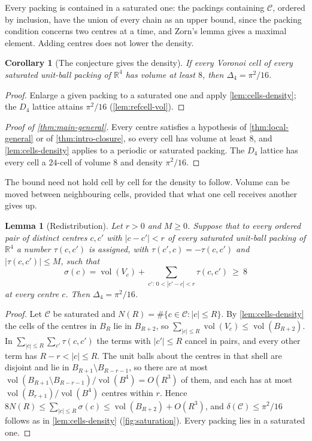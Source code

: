 \documentclass[11pt,reqno]{amsart}
\renewcommand{\_}{\origunderscore\allowbreak}
\numberwithin{equation}{section}
\theoremstyle{plain}
\newtheorem{lem}[thm]{Lemma}
\newtheorem{cor}[thm]{Corollary}
\theoremstyle{definition}
\theoremstyle{remark}
\DeclareMathOperator{\vol}{vol}
\begin{document}
Every packing is contained in a saturated one: the packings containing
$\mathcal{C}$, ordered by inclusion, have the union of every chain as an
upper bound, since the packing condition concerns two centres at a time,
and Zorn's lemma gives a maximal element. Adding centres does not lower
the density.

\begin{cor}[The conjecture gives the density]\label{cor:conj-density}
If every Voronoi cell of every saturated unit-ball packing of
$\mathbb{R}^4$ has volume at least $8$, then $\Delta_4=\pi^2/16$.
\end{cor}

\begin{proof}
Enlarge a given packing to a saturated one and apply
\cref{lem:cells-density}; the $D_4$ lattice attains $\pi^2/16$
(\cref{lem:refcell-vol}).
\end{proof}

\begin{proof}[Proof of \cref{thm:main-general}]
Every centre satisfies a hypothesis of \cref{thm:local-general} or of
\cref{thm:intro-closure}, so every cell has volume at least $8$, and
\cref{lem:cells-density} applies to a periodic or saturated packing. The
$D_4$ lattice has every cell a $24$-cell of volume $8$ and density
$\pi^2/16$.
\end{proof}

The bound need not hold cell by cell for the density to follow. Volume
can be moved between neighbouring cells, provided that what one cell
receives another gives up.

\begin{lem}[Redistribution]\label{lem:redistribution}
Let $r>0$ and $M\ge0$. Suppose that to every ordered pair of distinct
centres $c,c'$ with $|c-c'|<r$ of every saturated unit-ball packing of
$\mathbb{R}^4$ a number $\tau(c,c')$ is assigned, with
$\tau(c',c)=-\tau(c,c')$ and $|\tau(c,c')|\le M$, such that
\[
  \sigma(c)=\vol(V_c)+\sum_{c':\,0<|c'-c|<r}\tau(c,c')\ \ge\ 8
\]
at every centre $c$. Then $\Delta_4=\pi^2/16$.
\end{lem}

\begin{proof}
Let $\mathcal{C}$ be saturated and $N(R)=\#\{c\in\mathcal{C}:|c|\le R\}$.
By \cref{lem:cells-density} the cells of the centres in $B_R$ lie in
$B_{R+2}$, so $\sum_{|c|\le R}\vol(V_c)\le\vol(B_{R+2})$. In
$\sum_{|c|\le R}\sum_{c'}\tau(c,c')$ the terms with $|c'|\le R$ cancel in
pairs, and every other term has $R-r<|c|\le R$. The unit balls about the
centres in that shell are disjoint and lie in $B_{R+1}\setminus B_{R-r-1}$,
so there are at most $\vol(B_{R+1}\setminus B_{R-r-1})/\vol(B^4)=O(R^3)$
of them, and each has at most $\vol(B_{r+1})/\vol(B^4)$ centres within $r$.
Hence
$8N(R)\le\sum_{|c|\le R}\sigma(c)\le\vol(B_{R+2})+O(R^3)$, and
$\delta(\mathcal{C})\le\pi^2/16$ follows as in \cref{lem:cells-density}
(\cref{fig:saturation}). Every packing lies in a saturated one.
\end{proof}
\end{document}
